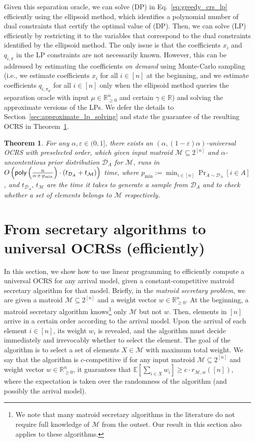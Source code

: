 \documentclass[11pt]{article}
\newcommand{\D}{\mathcal D}
\def \E {\mathbb{E}}
\newcommand{\M}{{\mathcal M}}
\newcommand{\eps}{\varepsilon}
\newcommand{\poly}{\textnormal{\sffamily poly}}
\newcommand{\R}{{\mathbb R}}
\newtheorem{theorem}{Theorem}[section]
\begin{document}
Given this separation oracle, we can solve (DP) in Eq.~\eqref{eq:greedy_crs_lp} efficiently using the ellipsoid method, which identifies a polynomial number of dual constraints that certify the optimal value of (DP). Then, we can solve (LP) efficiently by restricting it to the variables that correspond to the dual constraints identified by the ellipsoid method. The only issue is that the coefficients $x_i$ and $q_{i,\pi}$ in the LP constraints are not necessarily known. However, this can be addressed by estimating the coefficients \emph{on demand} using Monte-Carlo sampling (i.e., we estimate coefficients $x_i$ for all $i\in[n]$ at the beginning, and we estimate coefficients $q_{i,\pi_{\mu}}$ for all $i\in[n]$ only when the ellipsoid method queries the separation oracle with input $\mu\in\R_{\ge0}^n$ and certain $\gamma\in\R$) and solving the approximate versions of the LPs. We defer the details to Section~\ref{sec:approximate_lp_solving} and state the guarantee of the resulting OCRS in Theorem~\ref{thm:universal_ocrs_linear_programming}.
\begin{theorem}\label{thm:universal_ocrs_linear_programming}
For any $\alpha,\eps\in(0,1]$, there exists an $(\alpha,(1-\eps)\alpha)$-universal OCRS with preselected order, which given input matroid $\M\subseteq2^{[n]}$ and $\alpha$-uncontentious prior distribution $\D_A$ for $\M$, runs in $O\left(\poly\left(\frac{n}{\alpha\cdot\eps\cdot p_{\min}}\right)\cdot(t_{\D_A}+t_{\M})\right)$ time, where $p_{\min}:=\min_{i\in[n]}\Pr_{A\sim\D_A}[i\in A]$, and $t_{\D_A},\,t_{\M}$ are the time it takes to generate a sample from $\D_A$ and to check whether a set of elements belongs to $\M$ respectively.
\end{theorem} 
\section{From secretary algorithms to universal OCRSs (efficiently)}\label{sec:secretary_to_ocrs}
In this section, we show how to use linear programming to efficiently compute a universal OCRS for any arrival model, given a constant-competitive matroid secretary algorithm for that model. Briefly, in the \emph{matroid secretary problem}, we are given a matroid $\M\subseteq2^{[n]}$ and a weight vector $w\in\R_{\ge0}^{n}$. At the beginning, a matroid secretary algorithm knows\footnote{We note that many matroid secretary algorithms in the literature do not require full knowledge of $\M$ from the outset. Our result in this section also applies to these algorithms.} only $\M$ but not $w$. Then, elements in $[n]$ arrive in a certain order according to the arrival model. Upon the arrival of each element $i\in[n]$, its weight $w_i$ is revealed, and the algorithm must decide immediately and irrevocably whether to select the element. The goal of the algorithm is to select a set of elements $X\in\M$ with maximum total weight. We say that the algorithm is $c$-competitive if for any input matroid $\M\subseteq2^{[n]}$ and weight vector $w\in\R_{\ge0}^{n}$, it guarantees that $\E[\sum_{i\in X}w_i]\ge c\cdot r_{\M,w}([n])$, where the expectation is taken over the randomness of the algorithm (and possibly the arrival model).
\end{document}
